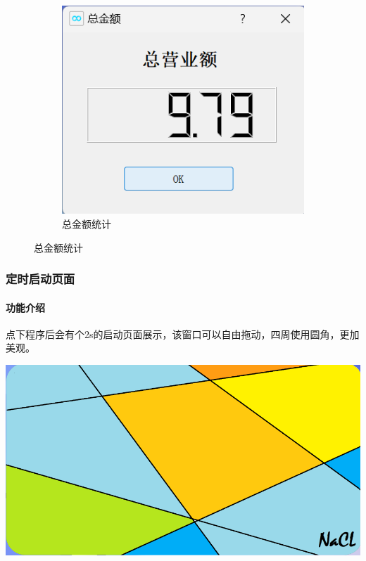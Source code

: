 \documentclass{article}
\begin{document}
\begin{figure}[htbp]
\begin{subfigure}{0.3\linewidth}
            \includegraphics[scale=0.5]{figure/count_total.png}
            \caption{总金额统计}
            \label{count_total}
        \end{subfigure}
    \end{figure}
    \subsubsection{定时启动页面}
    \begin{minipage}[h]{0.45\linewidth}
        \paragraph{功能介绍}
            点下程序后会有个2s的启动页面展示，该窗口可以自由拖动，四周使用圆角，更加美观。
    \end{minipage}
    \begin{minipage}[h]{0.45\linewidth}
        \centering
        \includegraphics[scale=0.5]{figure/welcome.png}
    \end{minipage}
\end{document}
